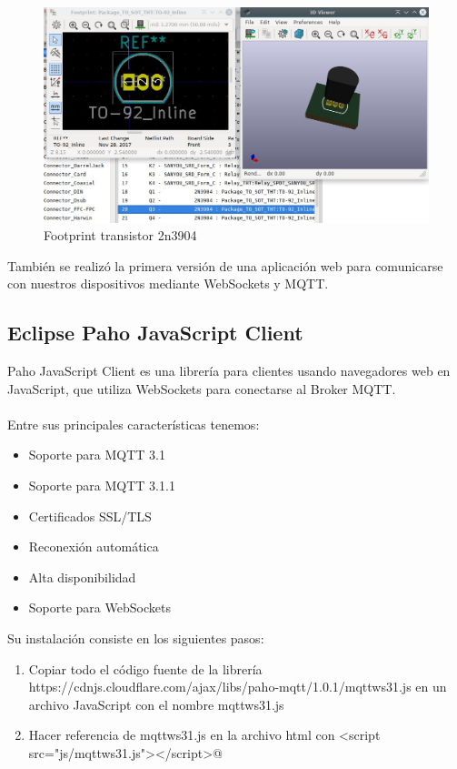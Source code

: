 \documentclass[oneside]{article}
\begin{document}
\begin{figure}[H]
\centering
\includegraphics[scale=0.5]{images/footprint2.jpg}
\caption{Footprint transistor 2n3904}
\end{figure}

\pagebreak
También se realizó la primera versión de una aplicación web para comunicarse con nuestros dispositivos mediante WebSockets y MQTT.

\subsection*{Eclipse Paho JavaScript Client}
Paho JavaScript Client es una librería para clientes usando navegadores web en JavaScript, que utiliza WebSockets para conectarse al Broker MQTT.
\\\\
Entre sus principales características tenemos:
\begin{itemize}
\item Soporte para MQTT 3.1
\item Soporte para MQTT 3.1.1
\item Certificados SSL/TLS
\item Reconexión automática
\item Alta disponibilidad
\item Soporte para WebSockets
\end{itemize}

Su instalación consiste en los siguientes pasos:
\begin{enumerate}
\item Copiar todo el código fuente de la librería https://cdnjs.cloudflare.com/ajax/libs/paho-mqtt/1.0.1/mqttws31.js en un archivo JavaScript con el nombre mqttws31.js
\item Hacer referencia de mqttws31.js en la archivo html con \verb@<script src="js/mqttws31.js"></script>@
\end{enumerate}
\end{document}
